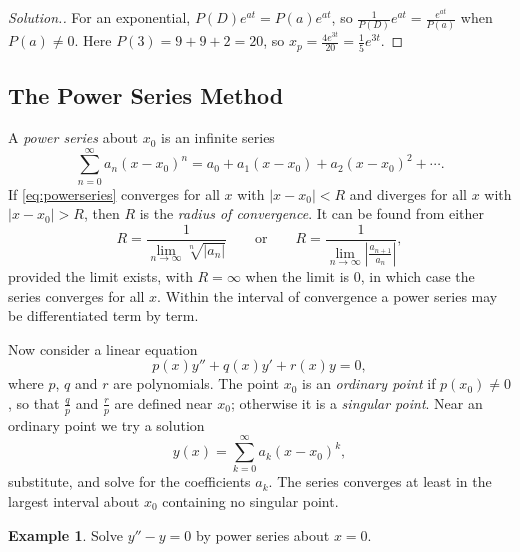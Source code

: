 \documentclass[11pt,a4paper]{article}
\theoremstyle{definition}
\newtheorem{exa}[thm]{Example}
\newenvironment{solution}
  {\renewcommand{\qedsymbol}{}\begin{proof}[\textit{Solution}.]}
  {\end{proof}}
\begin{document}
\begin{solution}
For an exponential, $P(D)e^{at} = P(a)e^{at}$, so
$\frac{1}{P(D)}e^{at} = \frac{e^{at}}{P(a)}$ when $P(a)\neq 0$. Here
$P(3) = 9 + 9 + 2 = 20$, so $x_p = \frac{4e^{3t}}{20} = \frac15 e^{3t}$.
\end{solution}

{\color[wave]{485}\subsection{The Power Series Method}}

A \emph{power series} about $x_0$ is an infinite series
\begin{equation}
\sum^{\infty}_{n = 0} a_n (x - x_0)^n = a_0 + a_1(x -x_0) + a_2(x -x_0)^2 +
\cdots .
\label{eq:powerseries}
\end{equation}
If \eqref{eq:powerseries} converges for all $x$ with $|x - x_0| <R$ and diverges
for all $x$ with $|x -x_0| > R$, then $R$ is the \emph{radius of convergence}. It
can be found from either
\[R = \frac{1}{\lim_{n \to \infty} \sqrt[n]{|a_n|}}\qquad\text{or}\qquad R =
\frac{1}{\lim_{n \to \infty} \left|\frac{a_{n+1}}{a_n}\right|},\]
provided the limit exists, with $R = \infty$ when the limit is $0$, in which case
the series converges for all $x$. Within the interval of convergence a power
series may be differentiated term by term.

Now consider a linear equation
\[p(x) y'' + q(x)y' + r(x)y = 0 ,\]
where $p$, $q$ and $r$ are polynomials. The point $x_0$ is an \emph{ordinary
point} if $p(x_0) \neq 0$, so that $\frac{q}{p}$ and $\frac{r}{p}$ are defined
near $x_0$; otherwise it is a \emph{singular point}. Near an ordinary point we
try a solution
\[y(x) = \sum^{\infty}_{k=0} a_k(x -x_0)^k ,\]
substitute, and solve for the coefficients $a_k$. The series converges at least
in the largest interval about $x_0$ containing no singular point.

\begin{exa}
\label{ex:seriescosh}
Solve $y'' - y = 0$ by power series about $x = 0$.
\end{exa}
\end{document}
